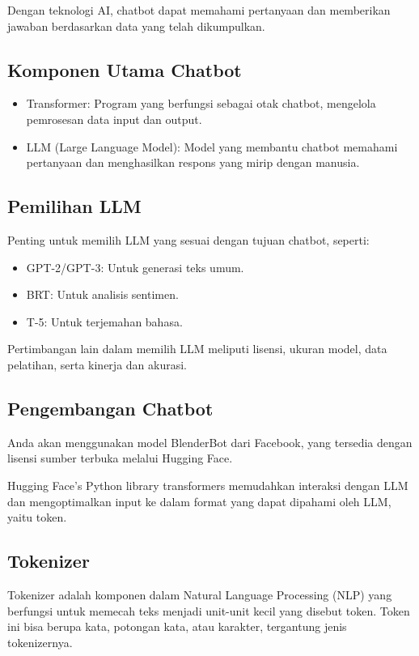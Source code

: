 \documentclass{article}
\begin{document}
Dengan teknologi AI, chatbot dapat memahami pertanyaan dan memberikan jawaban berdasarkan data yang telah dikumpulkan.

\subsection{Komponen Utama Chatbot}
\begin{itemize}
    \item Transformer: Program yang berfungsi sebagai otak chatbot, mengelola pemrosesan data input dan output.
    \item LLM (Large Language Model): Model yang membantu chatbot memahami pertanyaan dan menghasilkan respons yang mirip dengan manusia.
\end{itemize}

\subsection{Pemilihan LLM}
Penting untuk memilih LLM yang sesuai dengan tujuan chatbot, seperti:
\begin{itemize}
    \item GPT-2/GPT-3: Untuk generasi teks umum.
    \item BRT: Untuk analisis sentimen.
    \item T-5: Untuk terjemahan bahasa.
\end{itemize}

Pertimbangan lain dalam memilih LLM meliputi lisensi, ukuran model, data pelatihan, serta kinerja dan akurasi.

\subsection{Pengembangan Chatbot}
Anda akan menggunakan model BlenderBot dari Facebook, yang tersedia dengan lisensi sumber terbuka melalui Hugging Face.

Hugging Face's Python library transformers memudahkan interaksi dengan LLM dan mengoptimalkan input ke dalam format yang dapat dipahami oleh LLM, yaitu token.

\subsection{Tokenizer}
Tokenizer adalah komponen dalam Natural Language Processing (NLP) yang berfungsi untuk memecah teks menjadi unit-unit kecil yang disebut token. Token ini bisa berupa kata, potongan kata, atau karakter, tergantung jenis tokenizernya.
\end{document}

